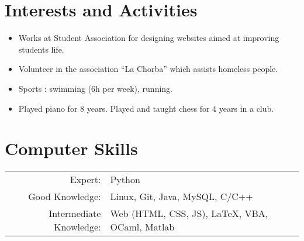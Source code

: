 \documentclass[a4paper,10pt]{article} %
\begin{document}
\section{Interests and Activities}

\begin{itemize}[noitemsep]
  \item Works at Student Association for designing websites aimed at improving students life.
  \item Volunteer in the association ``La Chorba'' which assists homeless people.
  \item Sports : swimming (6h per week), running.
  \item Played piano for 8 years. Played and taught chess for 4 years in a club.
\end{itemize}



\section{Computer Skills}

\begin{tabular}{rl}
  Expert: & Python\\
  Good Knowledge: & Linux, Git, Java, MySQL, C/C++\\
  Intermediate Knowledge: & Web (HTML, CSS, JS), \LaTeX, VBA, OCaml, Matlab
\end{tabular}
\end{document}
